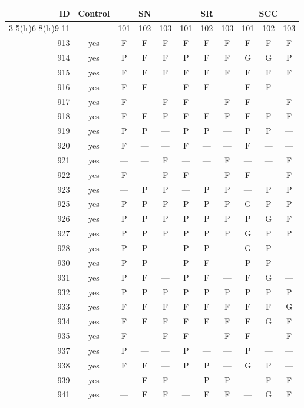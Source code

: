 \begin{table}[p]\centering\small
\begin{tabular*}{\textwidth}{@{\extracolsep{\fill}}rc*{9}{c}@{}}\toprule
ID & Control & \multicolumn{3}{c}{SN} & \multicolumn{3}{c}{SR} & \multicolumn{3}{c}{SCC}\\
\cmidrule(lr){3-5}\cmidrule(lr){6-8}\cmidrule(lr){9-11}
 & & 101 & 102 & 103 & 101 & 102 & 103 & 101 & 102 & 103\\\midrule
913 & yes & F & F & F & F & F & F & F & F & F\\
914 & yes & P & F & F & P & F & F & G & G & P\\
915 & yes & F & F & F & F & F & F & F & F & F\\
916 & yes & F & F & — & F & F & — & F & F & —\\
917 & yes & F & — & F & F & — & F & F & — & F\\
918 & yes & F & F & F & F & F & F & F & F & F\\
919 & yes & P & P & — & P & P & — & P & P & —\\
920 & yes & F & — & — & F & — & — & F & — & —\\
921 & yes & — & — & F & — & — & F & — & — & F\\
922 & yes & F & — & F & F & — & F & F & — & F\\
923 & yes & — & P & P & — & P & P & — & P & P\\
925 & yes & P & P & P & P & P & P & G & P & P\\
926 & yes & P & P & P & P & P & P & P & G & F\\
927 & yes & P & P & P & P & P & P & G & P & P\\
928 & yes & P & P & — & P & P & — & G & P & —\\
930 & yes & P & P & — & P & F & — & P & P & —\\
931 & yes & P & F & — & P & F & — & F & G & —\\
932 & yes & P & P & P & P & P & P & P & P & P\\
933 & yes & F & F & F & F & F & F & F & F & G\\
934 & yes & F & F & F & F & F & F & F & G & F\\
935 & yes & F & — & F & F & — & F & F & — & F\\
937 & yes & P & — & — & P & — & — & P & — & —\\
938 & yes & F & F & — & P & P & — & G & P & —\\
939 & yes & — & F & F & — & P & P & — & F & F\\
941 & yes & — & F & F & — & F & F & — & G & F\\

\end{tabular*}
\end{table}
